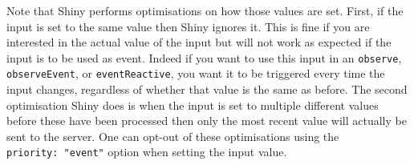 \documentclass[
]{krantz}
\makeatletter
\newenvironment{Shaded}{\begin{snugshade}}{\end{snugshade}}
\newcommand{\CommentTok}[1]{\textcolor[rgb]{0.37,0.37,0.37}{\textit{#1}}}
\newcommand{\ControlFlowTok}[1]{\textcolor[rgb]{0.27,0.27,0.27}{\textbf{#1}}}
\newcommand{\DataTypeTok}[1]{\textcolor[rgb]{0.27,0.27,0.27}{#1}}
\newcommand{\KeywordTok}[1]{\textcolor[rgb]{0.27,0.27,0.27}{\textbf{#1}}}
\newcommand{\NormalTok}[1]{#1}
\newcommand{\OperatorTok}[1]{\textcolor[rgb]{0.43,0.43,0.43}{\textbf{#1}}}
\newcommand{\StringTok}[1]{\textcolor[rgb]{0.5,0.5,0.5}{#1}}
\newenvironment{kframe}{%
\medskip{}
\setlength{\fboxsep}{.8em}
 \def\at@end@of@kframe{}%
 \ifinner\ifhmode%
  \def\at@end@of@kframe{\end{minipage}}%
  \begin{minipage}{\columnwidth}%
 \fi\fi%
 \def\FrameCommand##1{\hskip\@totalleftmargin \hskip-\fboxsep
 \colorbox{shadecolor}{##1}\hskip-\fboxsep
     \hskip-\linewidth \hskip-\@totalleftmargin \hskip\columnwidth}%
 \MakeFramed {\advance\hsize-\width
   \@totalleftmargin\z@ \linewidth\hsize
   \@setminipage}}%
 {\par\unskip\endMakeFramed%
 \at@end@of@kframe}
\renewenvironment{Shaded}{\begin{kframe}}{\end{kframe}}
\makeatother
\begin{document}
\begin{Shaded}
\end{Shaded}

Note that Shiny performs optimisations on how those values are set. First, if the input is set to the same value then Shiny ignores it. This is fine if you are interested in the actual value of the input but will not work as expected if the input is to be used as event. Indeed if you want to use this input in an \texttt{observe}, \texttt{observeEvent}, or \texttt{eventReactive}, you want it to be triggered every time the input changes, regardless of whether that value is the same as before. The second optimisation Shiny does is when the input is set to multiple different values before these have been processed then only the most recent value will actually be sent to the server. One can opt-out of these optimisations using the \texttt{priority:\ "event"} option when setting the input value.
\end{document}
